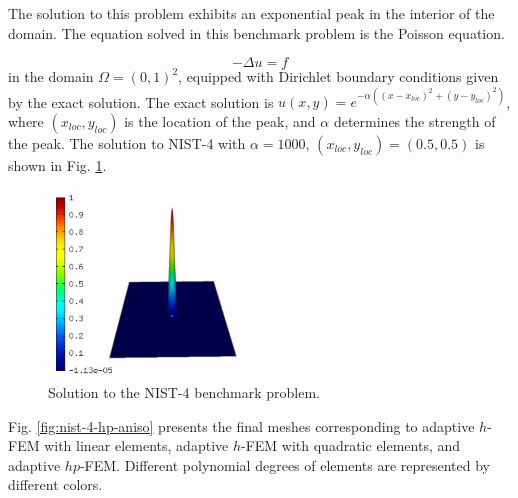 \documentclass[12pt]{elsarticle}
\begin{document}
The solution to this problem exhibits an exponential peak in the interior of the domain.
The equation solved in this benchmark problem is the Poisson equation.

\begin{equation} \label{poisson-peak}
-\Delta u = f
\end{equation}
in the domain $\Omega = (0, 1)^2$, equipped with Dirichlet
boundary conditions given by the exact solution.
The exact solution is
$u(x,y) = e^{-\alpha ((x - x_{loc})^{2} + (y - y_{loc})^{2})}$,
where $(x_{loc}, y_{loc})$ is the location of the peak,
and $\alpha$ determines the strength of the peak.
The solution to NIST-4 with $\alpha = 1000$,
$(x_{loc}, y_{loc}) = (0.5, 0.5)$ is shown in Fig. \ref{fig:sln-nist04}.

\begin{figure}[H]
\centering
\includegraphics[height=5cm]{mafig23.pdf}
\caption{Solution to the NIST-4 benchmark problem.}
\vspace{-3mm}
\label{fig:sln-nist04}
\end{figure}

Fig. \ref{fig:nist-4-hp-aniso} presents the final meshes corresponding to adaptive $h$-FEM with
linear elements, adaptive $h$-FEM with quadratic elements, and adaptive $hp$-FEM. Different
polynomial degrees of elements are represented by different colors.
\end{document}
